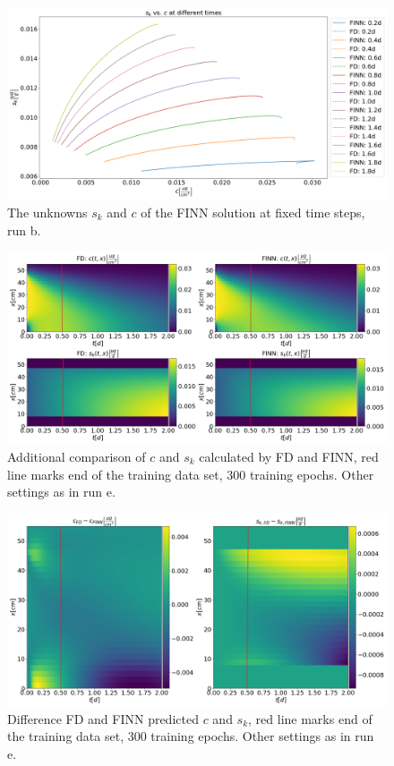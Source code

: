 \begin{figure}
    \centering
    \includegraphics[scale=0.3]{images/res_sorp_synt_pf.png}
    \caption[Comparison of FD and FINN sorption behavior, run b]{The unknowns $s_k$ and $c$ of the FINN solution at fixed time steps, run b.}
    \label{fig:res_sorp_synt_pf}
\end{figure}
\begin{figure}
	\centering
	\includegraphics[scale=0.3]{images/res_ov_synt_FGR_300_m.png}
\caption[Additional comparison of FINN and FD solution]{Additional comparison of $c$ and $s_k$ calculated by FD and FINN, red line marks end of the training data set, 300 training epochs. Other settings as in run e.}
\label{fig:res_ov_synt_FGR_300_m}
\end{figure}
\begin{figure}
	\centering
	\includegraphics[scale=0.3]{images/res_diff_synt_FGR_300_m.png}
\caption[Additional difference of FINN and FD]{Difference FD and FINN predicted $c$ and $s_k$, red line marks end of the training data set, 300 training epochs. Other settings as in run e.}
\label{fig:res_diff_synt_FGR_300_m}
\end{figure}

